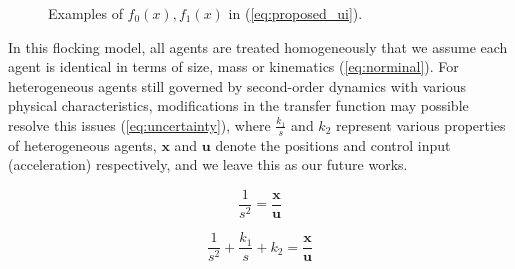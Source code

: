 \begin{figure}[htb]
  \centering
  \caption{Examples of $f_0(x), f_1(x)$ in (\ref{eq:proposed_ui}).}\label{fig:f0f1}
\end{figure}

In this flocking model, all agents are treated homogeneously that we assume each agent is identical in terms of size, mass or kinematics (\ref{eq:norminal}). For heterogeneous agents still governed by second-order dynamics with various physical characteristics, modifications in the transfer function may possible resolve this issues (\ref{eq:uncertainty}), where $\frac{k_1}{s}$ and $k_2$ represent various properties of heterogeneous agents, $\mathbf{x}$ and $\mathbf{u}$ denote the positions and control input (acceleration) respectively, and we leave this as our future works.

\begin{equation}\label{eq:norminal}
\frac{1}{s^2}=\frac{\mathbf{x}}{\mathbf{u}}
\end{equation}

\begin{equation}\label{eq:uncertainty}
\frac{1}{s^2}+\frac{k_1}{s}+k_2=\frac{\mathbf{x}}{\mathbf{u}}
\end{equation}

